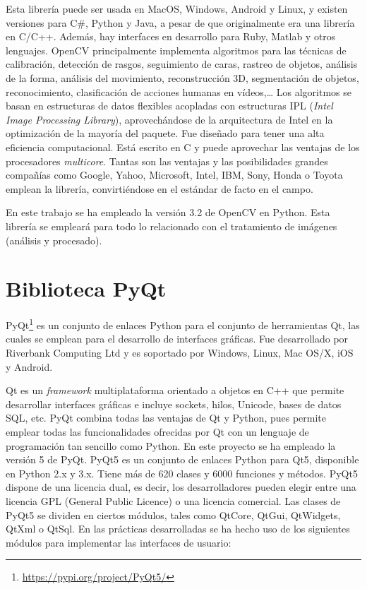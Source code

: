 Esta librería puede ser usada en MacOS, Windows, Android y Linux, y existen versiones para C\#, Python y Java, a pesar de que originalmente era una librería en C/C++. Además, hay interfaces en desarrollo para Ruby, Matlab y otros lenguajes.
OpenCV principalmente implementa algoritmos para las técnicas de calibración, detección de rasgos, seguimiento de caras, rastreo de objetos, análisis de la forma, análisis del movimiento, reconstrucción 3D, segmentación de objetos, reconocimiento, clasificación de acciones humanas en vídeos,…  Los algoritmos se basan en estructuras de datos flexibles acopladas con estructuras IPL (\textit{Intel Image Processing Library}), aprovechándose de la arquitectura de Intel en la optimización de la mayoría del paquete.
Fue diseñado para tener una alta eficiencia computacional. Está escrito en C y puede aprovechar las ventajas de los procesadores \textit{multicore}. Tantas son las ventajas y las posibilidades grandes compañías como Google, Yahoo, Microsoft, Intel, IBM, Sony, Honda o Toyota emplean la librería, convirtiéndose en el estándar de facto en el campo. 

En este trabajo se ha empleado la versión 3.2 de OpenCV en Python. Esta librería se empleará para todo lo relacionado con el tratamiento de imágenes (análisis y procesado). 

\section{Biblioteca PyQt}
PyQt\footnote{\url{https://pypi.org/project/PyQt5/}} es un conjunto de enlaces Python para el conjunto de herramientas Qt, las cuales se emplean para el desarrollo de interfaces gráficas. Fue desarrollado por Riverbank Computing Ltd y es soportado por Windows, Linux, Mac OS/X, iOS y Android.

Qt es un \textit{framework} multiplataforma orientado a objetos en C++  que permite desarrollar interfaces gráficas e incluye sockets, hilos, Unicode, bases de datos SQL, etc. PyQt combina todas las ventajas de Qt y Python, pues permite emplear todas las funcionalidades ofrecidas por Qt con un lenguaje de programación tan sencillo como Python.
En este proyecto se ha empleado la versión 5 de PyQt. PyQt5 es un conjunto de enlaces Python para Qt5, disponible en Python 2.x y 3.x. Tiene más de 620 clases y 6000 funciones y métodos. PyQt5 dispone de una licencia dual, es decir, los desarrolladores pueden elegir entre una licencia GPL (General Public Licence) o una licencia comercial. 
Las clases de PyQt5 se dividen en ciertos módulos, tales como QtCore, QtGui, QtWidgets, QtXml o QtSql. En las prácticas desarrolladas se ha hecho uso de los siguientes módulos para implementar las interfaces de usuario:

